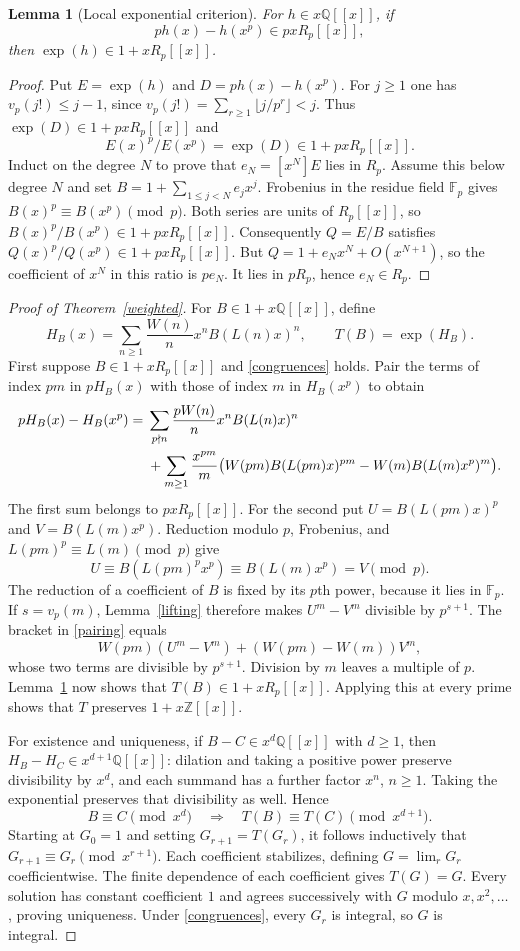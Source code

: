 \documentclass[11pt]{article}
\newtheorem{lemma}[theorem]{Lemma}
\newcommand{\Z}{\mathbb Z}
\newcommand{\Q}{\mathbb Q}
\begin{document}
\begin{lemma}[Local exponential criterion]\label{dwork}
For $h\in x\Q[[x]]$, if
\[
 ph(x)-h(x^p)\in pxR_p[[x]],
\]
then $\exp(h)\in1+xR_p[[x]]$.
\end{lemma}
\begin{proof}
Put $E=\exp(h)$ and $D=ph(x)-h(x^p)$.
For $j\geq1$ one has $v_p(j!)\leq j-1$, since
$v_p(j!)=\sum_{r\geq1}\lfloor j/p^r\rfloor<j$.
Thus $\exp(D)\in1+pxR_p[[x]]$ and
\[
 E(x)^p/E(x^p)=\exp(D)\in1+pxR_p[[x]].
\]
Induct on the degree $N$ to prove that $e_N=[x^N]E$ lies in $R_p$.
Assume this below degree $N$ and set
$B=1+\sum_{1\leq j<N}e_jx^j$. Frobenius in the residue field $\mathbb F_p$
gives $B(x)^p\equiv B(x^p)\pmod p$. Both series are units of $R_p[[x]]$,
so $B(x)^p/B(x^p)\in1+pxR_p[[x]]$.
Consequently $Q=E/B$ satisfies $Q(x)^p/Q(x^p)\in1+pxR_p[[x]]$.
But $Q=1+e_Nx^N+O(x^{N+1})$, so the coefficient of $x^N$ in this
ratio is $pe_N$. It lies in $pR_p$, hence $e_N\in R_p$.
\end{proof}

\begin{proof}[Proof of Theorem~\ref{weighted}]
For $B\in1+x\Q[[x]]$, define
\[
 H_B(x)=\sum_{n\geq1}\frac{W(n)}n x^n B(L(n)x)^n,
 \qquad T(B)=\exp(H_B).
\]
First suppose $B\in1+xR_p[[x]]$ and \eqref{congruences} holds.
Pair the terms of index $pm$ in $pH_B(x)$ with those of index $m$
in $H_B(x^p)$ to obtain
\begin{align}\label{pairing}
 pH_B(x)-H_B(x^p)
 ={}&\sum_{p\nmid n}\frac{pW(n)}n x^nB(L(n)x)^n\notag\\
 &+\sum_{m\geq1}\frac{x^{pm}}m
 \bigl(W(pm)B(L(pm)x)^{pm}-W(m)B(L(m)x^p)^m\bigr).
\end{align}
The first sum belongs to $pxR_p[[x]]$.
For the second put $U=B(L(pm)x)^p$ and $V=B(L(m)x^p)$.
Reduction modulo $p$, Frobenius, and $L(pm)^p\equiv L(m)\pmod p$ give
\[
 U\equiv B(L(pm)^p x^p)\equiv B(L(m)x^p)=V\pmod p.
\]
The reduction of a coefficient of $B$ is fixed by its $p$th power,
because it lies in $\mathbb F_p$. If $s=v_p(m)$, Lemma~\ref{lifting}
therefore makes $U^m-V^m$ divisible by $p^{s+1}$.
The bracket in \eqref{pairing} equals
\[
 W(pm)(U^m-V^m)+(W(pm)-W(m))V^m,
\]
whose two terms are divisible by $p^{s+1}$.
Division by $m$ leaves a multiple of $p$. Lemma~\ref{dwork} now
shows that $T(B)\in1+xR_p[[x]]$.
Applying this at every prime shows that $T$ preserves $1+x\Z[[x]]$.

For existence and uniqueness, if $B-C\in x^d\Q[[x]]$ with $d\geq1$,
then $H_B-H_C\in x^{d+1}\Q[[x]]$: dilation and taking a positive
power preserve divisibility by $x^d$, and each summand has a further
factor $x^n$, $n\geq1$. Taking the exponential preserves that
divisibility as well. Hence
\[
 B\equiv C\pmod{x^d}\quad\Longrightarrow\quad
 T(B)\equiv T(C)\pmod{x^{d+1}}.
\]
Starting at $G_0=1$ and setting $G_{r+1}=T(G_r)$, it follows inductively
that $G_{r+1}\equiv G_r\pmod{x^{r+1}}$.
Each coefficient stabilizes, defining $G=\lim_rG_r$ coefficientwise.
The finite dependence of each coefficient gives $T(G)=G$.
Every solution has constant coefficient $1$ and agrees successively
with $G$ modulo $x,x^2,\ldots$, proving uniqueness.
Under \eqref{congruences}, every $G_r$ is integral, so $G$ is integral.
\end{proof}
\end{document}
